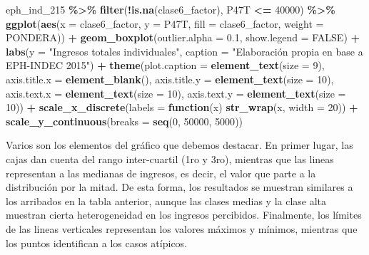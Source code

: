 \documentclass[
]{article}
\newenvironment{Shaded}{\begin{snugshade}}{\end{snugshade}}
\newcommand{\AttributeTok}[1]{\textcolor[rgb]{0.13,0.29,0.53}{#1}}
\newcommand{\ConstantTok}[1]{\textcolor[rgb]{0.56,0.35,0.01}{#1}}
\newcommand{\ControlFlowTok}[1]{\textcolor[rgb]{0.13,0.29,0.53}{\textbf{#1}}}
\newcommand{\DecValTok}[1]{\textcolor[rgb]{0.00,0.00,0.81}{#1}}
\newcommand{\FloatTok}[1]{\textcolor[rgb]{0.00,0.00,0.81}{#1}}
\newcommand{\FunctionTok}[1]{\textcolor[rgb]{0.13,0.29,0.53}{\textbf{#1}}}
\newcommand{\NormalTok}[1]{#1}
\newcommand{\SpecialCharTok}[1]{\textcolor[rgb]{0.81,0.36,0.00}{\textbf{#1}}}
\newcommand{\StringTok}[1]{\textcolor[rgb]{0.31,0.60,0.02}{#1}}
\begin{document}
\begin{Shaded}
\begin{Highlighting}[]
\NormalTok{eph\_ind\_215 }\SpecialCharTok{\%\textgreater{}\%}
    \FunctionTok{filter}\NormalTok{(}\SpecialCharTok{!}\FunctionTok{is.na}\NormalTok{(clase6\_factor), P47T }\SpecialCharTok{\textless{}=} \DecValTok{40000}\NormalTok{) }\SpecialCharTok{\%\textgreater{}\%}
    \FunctionTok{ggplot}\NormalTok{(}\FunctionTok{aes}\NormalTok{(}\AttributeTok{x =}\NormalTok{ clase6\_factor, }\AttributeTok{y =}\NormalTok{ P47T, }\AttributeTok{fill =}\NormalTok{ clase6\_factor, }\AttributeTok{weight =}\NormalTok{ PONDERA)) }\SpecialCharTok{+}
    \FunctionTok{geom\_boxplot}\NormalTok{(}\AttributeTok{outlier.alpha =} \FloatTok{0.1}\NormalTok{, }\AttributeTok{show.legend =} \ConstantTok{FALSE}\NormalTok{) }\SpecialCharTok{+} \FunctionTok{labs}\NormalTok{(}\AttributeTok{y =} \StringTok{"Ingresos totales individuales"}\NormalTok{,}
    \AttributeTok{caption =} \StringTok{"Elaboración propia en base a EPH{-}INDEC 2015"}\NormalTok{) }\SpecialCharTok{+} \FunctionTok{theme}\NormalTok{(}\AttributeTok{plot.caption =} \FunctionTok{element\_text}\NormalTok{(}\AttributeTok{size =} \DecValTok{9}\NormalTok{),}
    \AttributeTok{axis.title.x =} \FunctionTok{element\_blank}\NormalTok{(), }\AttributeTok{axis.title.y =} \FunctionTok{element\_text}\NormalTok{(}\AttributeTok{size =} \DecValTok{10}\NormalTok{), }\AttributeTok{axis.text.x =} \FunctionTok{element\_text}\NormalTok{(}\AttributeTok{size =} \DecValTok{10}\NormalTok{),}
    \AttributeTok{axis.text.y =} \FunctionTok{element\_text}\NormalTok{(}\AttributeTok{size =} \DecValTok{10}\NormalTok{)) }\SpecialCharTok{+} \FunctionTok{scale\_x\_discrete}\NormalTok{(}\AttributeTok{labels =} \ControlFlowTok{function}\NormalTok{(x) }\FunctionTok{str\_wrap}\NormalTok{(x,}
    \AttributeTok{width =} \DecValTok{20}\NormalTok{)) }\SpecialCharTok{+} \FunctionTok{scale\_y\_continuous}\NormalTok{(}\AttributeTok{breaks =} \FunctionTok{seq}\NormalTok{(}\DecValTok{0}\NormalTok{, }\DecValTok{50000}\NormalTok{, }\DecValTok{5000}\NormalTok{))}
\end{Highlighting}
\end{Shaded}

Varios son los elementos del gráfico que debemos destacar. En primer lugar, las cajas dan cuenta del rango inter-cuartil (1ro y 3ro), mientras que las lineas representan a las medianas de ingresos, es decir, el valor que parte a la distribución por la mitad. De esta forma, los resultados se muestran similares a los arribados en la tabla anterior, aunque las clases medias y la clase alta muestran cierta heterogeneidad en los ingresos percibidos. Finalmente, los límites de las lineas verticales representan los valores máximos y mínimos, mientras que los puntos identifican a los casos atípicos.
\end{document}
